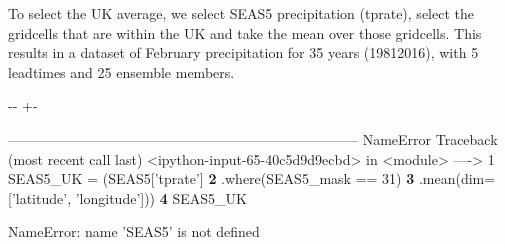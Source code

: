 \documentclass[letterpaper,10pt,english]{sphinxmanual}
\newlength\nbsphinxcodecellspacing
\begin{document}
To select the UK average, we select SEAS5 precipitation (tprate), select the gridcells that are within the UK and take the mean over those gridcells. This results in a dataset of February precipitation for 35 years (1981\sphinxhyphen{}2016), with 5 leadtimes and 25 ensemble members.

{
\begin{sphinxVerbatim}[commandchars=\\\{\}]
\llap{\color{nbsphinxin}[65]:\,\hspace{\fboxrule}\hspace{\fboxsep}}  \PYG{p}{[}\PYG{p}{]}
              
            \PYG{p}{[} \PYG{p}{]}
\end{sphinxVerbatim}
}

{

\kern-\sphinxverbatimsmallskipamount\kern-\baselineskip
\kern+\FrameHeightAdjust\kern-\fboxrule
\vspace{\nbsphinxcodecellspacing}

\begin{sphinxVerbatim}[commandchars=\\\{\}]
\textcolor{ansi-red}{---------------------------------------------------------------------------}
\textcolor{ansi-red}{NameError}                                 Traceback (most recent call last)
\textcolor{ansi-green}{<ipython-input-65-40c5d9d9ecbd>} in \textcolor{ansi-cyan}{<module>}
\textcolor{ansi-green}{----> 1}\textcolor{ansi-red}{ SEAS5\_UK = (SEAS5['tprate']
}\textcolor{ansi-green-intense}{\textbf{      2}}             \textcolor{ansi-blue}{.}where\textcolor{ansi-blue}{(}SEAS5\_mask \textcolor{ansi-blue}{==} \textcolor{ansi-cyan}{31}\textcolor{ansi-blue}{)}
\textcolor{ansi-green-intense}{\textbf{      3}}             .mean(dim=['latitude', 'longitude']))
\textcolor{ansi-green-intense}{\textbf{      4}} SEAS5\_UK

\textcolor{ansi-red}{NameError}: name 'SEAS5' is not defined
\end{sphinxVerbatim}
}
\end{document}
